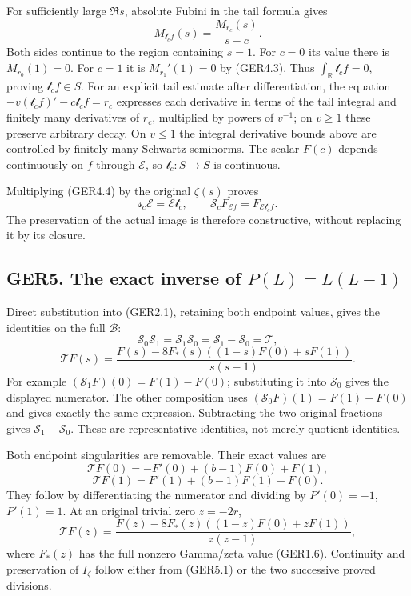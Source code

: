 For sufficiently large \(\Re s\), absolute Fubini in the tail formula
gives \[
M_{\mathscr t_cf}(s)=\frac{M_{r_c}(s)}{s-c}.
\tag{GER4.4}
\] Both sides continue to the region containing \(s=1\). For \(c=0\) its
value there is \(M_{r_0}(1)=0\). For \(c=1\) it is \(M_{r_1}'(1)=0\) by
(GER4.3). Thus \(\int_{\mathbb R}\mathscr t_cf=0\), proving
\(\mathscr t_cf\in S\). For an explicit tail estimate after
differentiation, the equation \(-v(\mathscr t_cf)'-c\mathscr t_cf=r_c\)
expresses each derivative in terms of the tail integral and finitely
many derivatives of \(r_c\), multiplied by powers of \(v^{-1}\); on
\(v\ge1\) these preserve arbitrary decay. On \(v\le1\) the integral
derivative bounds above are controlled by finitely many Schwartz
seminorms. The scalar \(F(c)\) depends continuously on \(f\) through
\(\mathcal E\), so \(\mathscr t_c:S\to S\) is continuous.

Multiplying (GER4.4) by the original \(\zeta(s)\) proves \[
\boxed{\mathscr s_c\mathcal E=\mathcal E\mathscr t_c,\qquad
\mathscr S_cF_{\mathcal Ef}=F_{\mathcal E\mathscr t_cf}.}
\tag{GER4.5}
\] The preservation of the actual image is therefore constructive,
without replacing it by its closure.

\subsection{\texorpdfstring{GER5. The exact inverse of
\(P(L)=L(L-1)\)}{GER5. The exact inverse of P(L)=L(L-1)}}\label{ger5.-the-exact-inverse-of-plll-1}

Direct substitution into (GER2.1), retaining both endpoint values, gives
the identities on the full \(\mathcal B\): \[
\boxed{\mathscr S_0\mathscr S_1
=\mathscr S_1\mathscr S_0
=\mathscr S_1-\mathscr S_0
=\mathscr T,}
\] \[
\mathscr TF(s)=
\frac{F(s)-8F_*(s)((1-s)F(0)+sF(1))}{s(s-1)}.
\tag{GER5.1}
\] For example \((\mathscr S_1F)(0)=F(1)-F(0)\); substituting it into
\(\mathscr S_0\) gives the displayed numerator. The other composition
uses \((\mathscr S_0F)(1)=F(1)-F(0)\) and gives exactly the same
expression. Subtracting the two original fractions gives
\(\mathscr S_1-\mathscr S_0\). These are representative identities, not
merely quotient identities.

Both endpoint singularities are removable. Their exact values are \[
\mathscr TF(0)=-F'(0)+(b-1)F(0)+F(1),
\] \[
\mathscr TF(1)=F'(1)+(b-1)F(1)+F(0).
\tag{GER5.2}
\] They follow by differentiating the numerator and dividing by
\(P'(0)=-1\), \(P'(1)=1\). At an original trivial zero \(z=-2r\), \[
\mathscr TF(z)=
\frac{F(z)-8F_*(z)((1-z)F(0)+zF(1))}{z(z-1)},
\tag{GER5.3}
\] where \(F_*(z)\) has the full nonzero Gamma/zeta value (GER1.6).
Continuity and preservation of \(I_\zeta\) follow either from (GER5.1)
or the two successive proved divisions.

